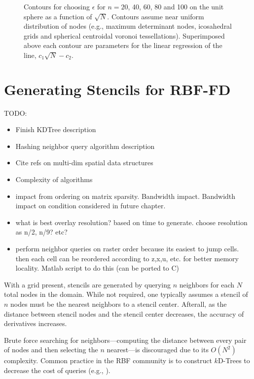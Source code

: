 \documentclass[11pt]{report}
\begin{document}
{\begin{figure}[htbp]
\caption{Contours for choosing $\epsilon$ for $n=20$, 40, 60, 80 and 100 on the unit sphere as a function of $\sqrt{N}$. Contours assume near uniform distribution of nodes (e.g., maximum determinant nodes, icosahedral grids and spherical centroidal voronoi tessellations). Superimposed above each contour are parameters for the linear regression of the line, $c_{1} \sqrt{N} - c_{2}$. }
\label{fig:epsilon_contours}
\end{figure}






\chapter{Generating Stencils for RBF-FD}
\label{chap:stencils}

TODO:
\begin{itemize}
\item Finish KDTree description
\item Hashing neighbor query algorithm description
\item Cite refs on multi-dim spatial data structures
\item Complexity of algorithms
\item impact from ordering on matrix sparsity. Bandwidth impact. Bandwidth impact on condition considered in future chapter. 
\item what is best overlay resolution? based on time to generate. choose resolution as n/2, n/9? etc? 
\item perform neighbor queries on raster order because its easiest to jump cells. then each cell can be reordered according to z,x,u, etc. for better memory locality. Matlab script to do this (can be ported to C)
\end{itemize}

With a grid present, stencils are generated by querying $n$ neighbors for each $N$ total nodes in the domain. While not required, one typically assumes a stencil of $n$ nodes must be the nearest neighbors to a stencil center. Afterall, as the distance between stencil nodes and the stencil center decreases, the accuracy of derivatives increases. 

Brute force searching for neighbors---computing the distance between every pair of nodes and then selecting the $n$ nearest---is discouraged due to its $O(N^2)$ complexity. Common practice in the RBF community is to construct $k$D-Trees to decrease the cost of queries (e.g., \cite{Fasshauer2007, FlyerLehto11, FornbergLehto11}). 

}
\end{document}
